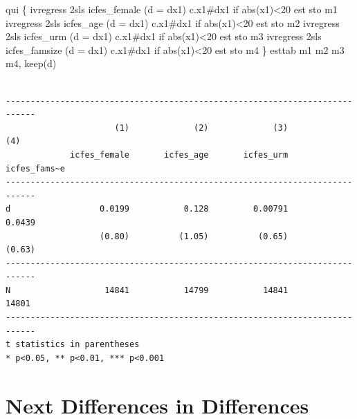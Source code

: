 \documentclass[
  letterpaper,
  DIV=11,
  numbers=noendperiod]{scrartcl}
\newenvironment{Shaded}{\begin{snugshade}}{\end{snugshade}}
\newcommand{\FunctionTok}[1]{\textcolor[rgb]{0.28,0.35,0.67}{#1}}
\newcommand{\KeywordTok}[1]{\textcolor[rgb]{0.00,0.23,0.31}{#1}}
\newcommand{\NormalTok}[1]{\textcolor[rgb]{0.00,0.23,0.31}{#1}}
\begin{document}
\begin{Shaded}
\begin{Highlighting}[]
\KeywordTok{qui}\NormalTok{ \{}
\NormalTok{ivregress 2sls icfes\_female (}\KeywordTok{d}\NormalTok{ = dx1) c.x1\#dx1    }\KeywordTok{if} \FunctionTok{abs}\NormalTok{(x1)\textless{}20}
\KeywordTok{est}\NormalTok{ sto m1}
\NormalTok{ivregress 2sls icfes\_age (}\KeywordTok{d}\NormalTok{ = dx1) c.x1\#dx1       }\KeywordTok{if} \FunctionTok{abs}\NormalTok{(x1)\textless{}20}
\KeywordTok{est}\NormalTok{ sto m2}
\NormalTok{ivregress 2sls icfes\_urm (}\KeywordTok{d}\NormalTok{ = dx1) c.x1\#dx1       }\KeywordTok{if} \FunctionTok{abs}\NormalTok{(x1)\textless{}20}
\KeywordTok{est}\NormalTok{ sto m3}
\NormalTok{ivregress 2sls icfes\_famsize (}\KeywordTok{d}\NormalTok{ = dx1) c.x1\#dx1       }\KeywordTok{if} \FunctionTok{abs}\NormalTok{(x1)\textless{}20}
\KeywordTok{est}\NormalTok{ sto m4}
\NormalTok{\}}
\NormalTok{esttab m1 m2 m3 m4, }\KeywordTok{keep}\NormalTok{(}\KeywordTok{d}\NormalTok{)}
\end{Highlighting}
\end{Shaded}

\begin{verbatim}

----------------------------------------------------------------------------
                      (1)             (2)             (3)             (4)   
             icfes_female       icfes_age       icfes_urm    icfes_fams~e   
----------------------------------------------------------------------------
d                  0.0199           0.128         0.00791          0.0439   
                   (0.80)          (1.05)          (0.65)          (0.63)   
----------------------------------------------------------------------------
N                   14841           14799           14841           14801   
----------------------------------------------------------------------------
t statistics in parentheses
* p<0.05, ** p<0.01, *** p<0.001
\end{verbatim}

\section{Next Differences in
Differences}\label{next-differences-in-differences}
\end{document}
